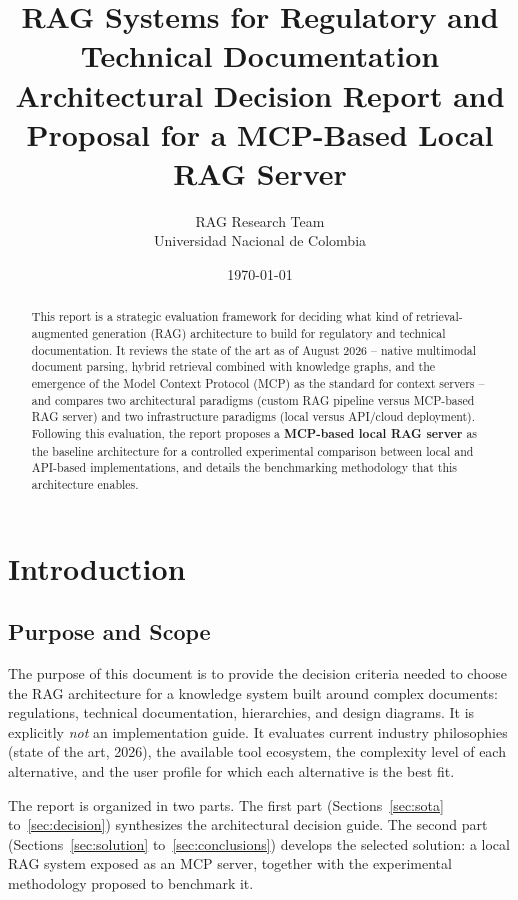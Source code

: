\documentclass[11pt,a4paper]{article}
\title{\textbf{RAG Systems for Regulatory and Technical Documentation}\\[2mm]
\large Architectural Decision Report and Proposal for a MCP-Based Local RAG Server}
\author{RAG Research Team\\Universidad Nacional de Colombia}
\date{\today}
\begin{document}
\maketitle

\begin{abstract}
\noindent
This report is a strategic evaluation framework for deciding what kind of
retrieval-augmented generation (RAG) architecture to build for regulatory and
technical documentation. It reviews the state of the art as of August 2026 --
native multimodal document parsing, hybrid retrieval combined with knowledge
graphs, and the emergence of the Model Context Protocol (MCP) as the standard
for context servers -- and compares two architectural paradigms (custom RAG
pipeline versus MCP-based RAG server) and two infrastructure paradigms (local
versus API/cloud deployment). Following this evaluation, the report proposes a
\textbf{MCP-based local RAG server} as the baseline architecture for a
controlled experimental comparison between local and API-based
implementations, and details the benchmarking methodology that this
architecture enables.
\end{abstract}

\section{Introduction}

\subsection{Purpose and Scope}

The purpose of this document is to provide the decision criteria needed to
choose the RAG architecture for a knowledge system built around complex
documents: regulations, technical documentation, hierarchies, and design
diagrams. It is explicitly \emph{not} an implementation guide. It evaluates
current industry philosophies (state of the art, 2026), the available tool
ecosystem, the complexity level of each alternative, and the user profile for
which each alternative is the best fit.

The report is organized in two parts. The first part (Sections~\ref{sec:sota}
to~\ref{sec:decision}) synthesizes the architectural decision guide. The
second part (Sections~\ref{sec:solution} to~\ref{sec:conclusions}) develops
the selected solution: a local RAG system exposed as an MCP server, together
with the experimental methodology proposed to benchmark it.
\end{document}
